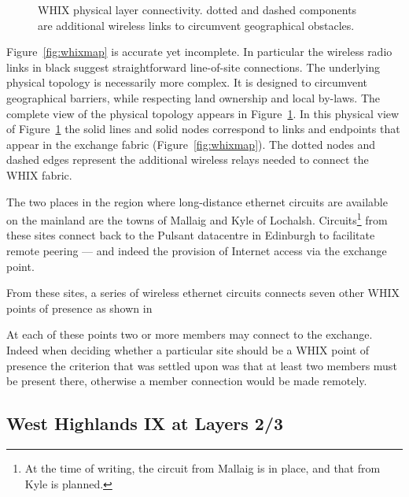 \begin{figure}[h]
  \resizebox{\linewidth}{!}{
    \begin{tikzpicture}
      \whixmeshdiagram
    \end{tikzpicture}
  }
  \caption{WHIX physical layer connectivity. dotted and
  dashed components are additional wireless links to circumvent geographical
  obstacles.}  
  \label{fig:phytop}
\end{figure}



Figure~\ref{fig:whixmap} is accurate yet incomplete. In particular the wireless
radio links in black suggest straightforward line-of-site connections. The
underlying physical topology is necessarily more complex. It is designed to
circumvent geographical barriers, while respecting land ownership and local
by-laws. The complete view of the physical topology appears in
Figure~\ref{fig:phytop}. In this physical view of Figure~\ref{fig:phytop} the
solid lines and solid nodes correspond to links and endpoints that appear in the
exchange fabric (Figure~\ref{fig:whixmap}). The dotted nodes and dashed edges
represent the additional wireless relays needed to connect the WHIX fabric.

The two places in the region where long-distance ethernet circuits are
available on the mainland are the towns of Mallaig and Kyle of
Lochalsh. Circuits\footnote{At the time of writing, the circuit from
Mallaig is in place, and that from Kyle is planned.} from these sites
connect back to the Pulsant datacentre in Edinburgh to facilitate
remote peering --- and indeed the provision of Internet access via the
exchange point.


From these sites, a series of wireless ethernet circuits connects
seven other \ac{WHIX} points of presence as shown in



At each of these points two or more members may connect to the
exchange. Indeed when deciding whether a particular site should be
a \ac{WHIX} point of presence the criterion that was settled upon was
that at least two members must be present there, otherwise a member
connection would be made remotely.




\subsection{West Highlands IX at Layers 2/3}

